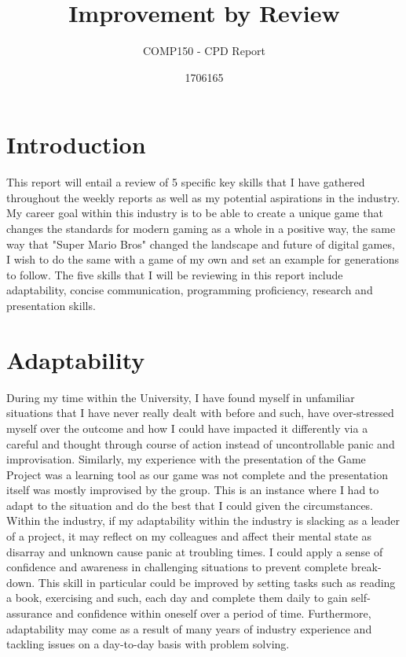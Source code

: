 \documentclass{scrartcl}
\title{Improvement by Review}
\subtitle{COMP150 - CPD Report}
\author{1706165}
\begin{document}
\maketitle

\section{Introduction}

This report will entail a review of 5 specific key skills that I have gathered throughout the weekly reports as well as my potential aspirations in the industry. My career goal within this industry is to be able to create a unique game that changes the standards for modern gaming as a whole in a positive way, the same way that "Super Mario Bros" changed the landscape and future of digital games, I wish to do the same with a game of my own and set an example for generations to follow. The five skills that I will be reviewing in this report include adaptability, concise communication, programming proficiency, research and presentation skills. 

\section{Adaptability}

During my time within the University, I have found myself in unfamiliar situations that I have never really dealt with before and such, have over-stressed myself over the outcome and how I could have impacted it differently via a careful and thought through course of action instead of uncontrollable panic and improvisation. Similarly, my experience with the presentation of the Game Project was a learning tool as our game was not complete and the presentation itself was mostly improvised by the group. This is an instance where I had to adapt to the situation and do the best that I could given the circumstances. Within the industry, if my adaptability within the industry is slacking as a leader of a project, it may reflect on my colleagues and affect their mental state as disarray and unknown cause panic at troubling times. I could apply a sense of confidence and awareness in challenging situations to prevent complete break-down. This skill in particular could be improved by setting tasks such as reading a book, exercising and such, each day and complete them daily to gain self-assurance and confidence within oneself over a period of time. Furthermore, adaptability may come as a result of many years of industry experience and tackling issues on a day-to-day basis with problem solving.
\end{document}
